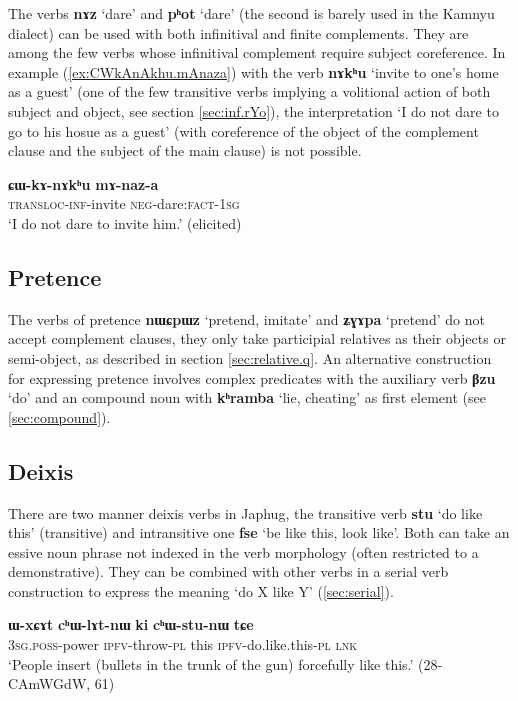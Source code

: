 \documentclass[oneside,a4paper,11pt]{article}
\newcommand{\ipa}[1]{\textbf{\phon#1}} %
\newcommand{\jpg}[2]{\ipa{#1} `#2'} %
\newcommand{\refb}[1]{(\ref{#1})}
\begin{document}
The verbs \jpg{nɤz}{dare} and \jpg{pʰot}{dare} (the second is barely used in the Kamnyu dialect) can be used with both infinitival and finite complements. They are among the few verbs whose infinitival complement require subject coreference. In example \refb{ex:CWkAnAkhu.mAnaza}  with the verb  \jpg{nɤkʰu}{invite to one's home as a guest} (one of the few transitive verbs implying a volitional action of both subject and object, see section \ref{sec:inf.rYo}), the interpretation `I do not dare to go to his hosue as a guest' (with coreference of the object of the complement clause and the subject of the main clause) is not possible.

\begin{exe}
\ex \label{ex:CWkAnAkhu.mAnaza}
\gll 
\ipa{ɕɯ-kɤ-nɤkʰu} \ipa{mɤ-naz-a} \\
\textsc{transloc-inf}-invite \textsc{neg}-dare:\textsc{fact-1sg} \\
\glt `I do not dare to invite him.' (elicited)
\end{exe}

\subsection{Pretence} \label{sec:pretence}
The verbs of pretence \jpg{nɯɕpɯz}{pretend, imitate} and \jpg{ʑɣɤpa}{pretend} do not accept complement clauses, they only take participial relatives as their objects or semi-object, as described in section \ref{sec:relative.q}. An alternative construction for expressing pretence involves complex predicates with the auxiliary verb \jpg{βzu}{do} and an compound noun with \jpg{kʰramba}{lie, cheating} as first element (see \ref{sec:compound}).

  \subsection{Deixis} \label{sec:deixis}
 There are two manner deixis verbs in Japhug, the transitive verb \jpg{stu}{do like this} (transitive) and intransitive one \jpg{fse}{be like this, look like}. Both can take an essive noun phrase not indexed in the verb morphology (often restricted to a demonstrative). They can be combined with other verbs in a serial verb construction to express the meaning `do X like Y' (\ref{sec:serial}).
 
 \begin{exe}
\ex \label{ex:chWtsunW}
\gll \ipa{ɯ-xɕɤt} 	\ipa{cʰɯ-lɤt-nɯ} 	\ipa{ki} 	\ipa{cʰɯ-stu-nɯ} 	\ipa{tɕe} \\
\textsc{3sg.poss}-power \textsc{ipfv}-throw-\textsc{pl} this  \textsc{ipfv}-do.like.this-\textsc{pl} \textsc{lnk} \\
\glt `People insert (bullets in the trunk of the gun) forcefully like this.' (28-CAmWGdW, 61)
\end{exe}
\end{document}
